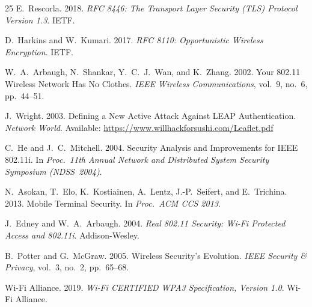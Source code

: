 \documentclass[journal]{IEEEtran}
\begin{document}
\begin{thebibliography}{25}
E.~Rescorla.
2018. \textit{RFC 8446: The Transport Layer Security (TLS) Protocol Version 1.3}.
IETF.

D.~Harkins and W.~Kumari.
2017. \textit{RFC 8110: Opportunistic Wireless Encryption}.
IETF.

W.~A.~Arbaugh, N.~Shankar, Y.~C.~J.~Wan, and K.~Zhang.
2002. Your 802.11 Wireless Network Has No Clothes.
\textit{IEEE Wireless Communications}, vol.~9, no.~6, pp.~44--51.

J.~Wright.
2003. Defining a New Active Attack Against LEAP Authentication.
\textit{Network World}. Available: \url{https://www.willhackforsushi.com/Leaflet.pdf}

C.~He and J.~C.~Mitchell.
2004. Security Analysis and Improvements for IEEE 802.11i.
In \textit{Proc.\ 11th Annual Network and Distributed System Security Symposium
(NDSS~2004)}.

N.~Asokan, T.~Elo, K.~Kostiainen, A.~Lentz, J.-P.~Seifert, and E.~Trichina.
2013. Mobile Terminal Security.
In \textit{Proc.\ ACM CCS 2013}.

J.~Edney and W.~A.~Arbaugh.
2004. \textit{Real 802.11 Security: Wi-Fi Protected Access and 802.11i}.
Addison-Wesley.

B.~Potter and G.~McGraw.
2005. Wireless Security's Evolution.
\textit{IEEE Security \& Privacy}, vol.~3, no.~2, pp.~65--68.

Wi-Fi Alliance.
2019. \textit{Wi-Fi CERTIFIED WPA3 Specification, Version 1.0}.
Wi-Fi Alliance.

\end{thebibliography}
\end{document}
